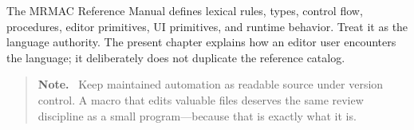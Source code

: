 \documentclass[a4paper,10pt,twoside,openany]{book}
\newcommand{\mrmac}{\textsc{MRMAC}}
\newenvironment{usernote}{\begin{quote}\small\textbf{Note.}\ }{\end{quote}}
\begin{document}
The \mrmac{} Reference Manual defines lexical rules, types, control flow,
procedures, editor primitives, UI primitives, and runtime behavior. Treat it
as the language authority. The present chapter explains how an editor user
encounters the language; it deliberately does not duplicate the reference
catalog.

\begin{usernote}
Keep maintained automation as readable source under version control. A macro
that edits valuable files deserves the same review discipline as a small
program---because that is exactly what it is.
\end{usernote}

\backmatter
\cleardoublepage
\printindex
\end{document}
